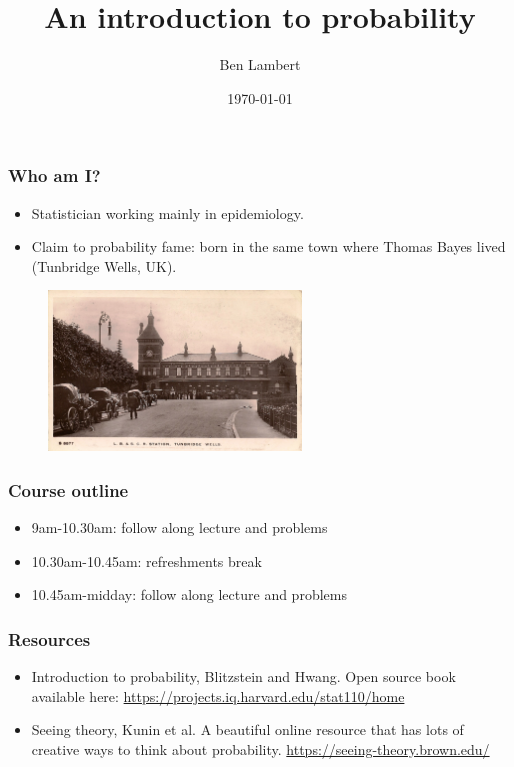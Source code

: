 \documentclass{beamer}
\title[Intro to probability]{An introduction to probability} %
\author{Ben Lambert} %
\institute[Univ. of Oxford] %
{
	University of Oxford \\ %
	\medskip
	\textit{ben.c.lambert@gmail.com} %
}
\date{\today} %
\begin{document}
	
	\begin{frame}
		\titlepage %
	\end{frame}

	\begin{frame}
		\frametitle{Who am I?}
		
		\begin{itemize}
			\item Statistician working mainly in epidemiology.
			\item Claim to probability fame: born in the same town where Thomas Bayes lived (Tunbridge Wells, UK).
		\end{itemize}
		
		\begin{figure}[ht]
			\centerline{\includegraphics[width=0.6\textwidth]{./figures/tunbridgeWells.jpg}}
		\end{figure}
		
	\end{frame}

	\begin{frame}
		\frametitle{Course outline}
		
		\begin{itemize}
			\item 9am-10.30am: follow along lecture and problems
			\item 10.30am-10.45am: refreshments break
			\item 10.45am-midday: follow along lecture and problems
		\end{itemize}
		
	\end{frame}

	\begin{frame}
		\frametitle{Resources}
		
		\begin{itemize}
			\item Introduction to probability, Blitzstein and Hwang. Open source book available here: \url{https://projects.iq.harvard.edu/stat110/home}
			\item Seeing theory, Kunin et al. A beautiful online resource that has lots of creative ways to think about probability. \url{https://seeing-theory.brown.edu/}
		\end{itemize}
		
	\end{frame}
\end{document}
